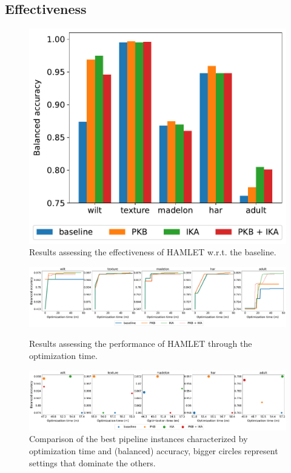 \subsection{Effectiveness}
\begin{figure}[t]
    \centering
    \includegraphics[scale=.45]{chapters/human-centric/hamlet/img/accuracy.pdf}
    \caption{Results assessing the effectiveness of HAMLET w.r.t. the baseline.}
    \label{hamlet-fig:effectiveness}
\end{figure}

\begin{figure}[h!]
    \RawFloats
    \centering
    \includegraphics[scale=.25]{chapters/human-centric/hamlet/img/accuracy_time.pdf}
    \caption{Results assessing the performance of HAMLET through the optimization time.}
    \label{hamlet-fig:efficiency}
    \includegraphics[scale=.25]{chapters/human-centric/hamlet/img/skyline.pdf}
    \caption{Comparison of the best pipeline instances characterized by optimization time and (balanced) accuracy, bigger circles represent settings that dominate the others.}
    \label{hamlet-fig:effskyline}
\end{figure}

